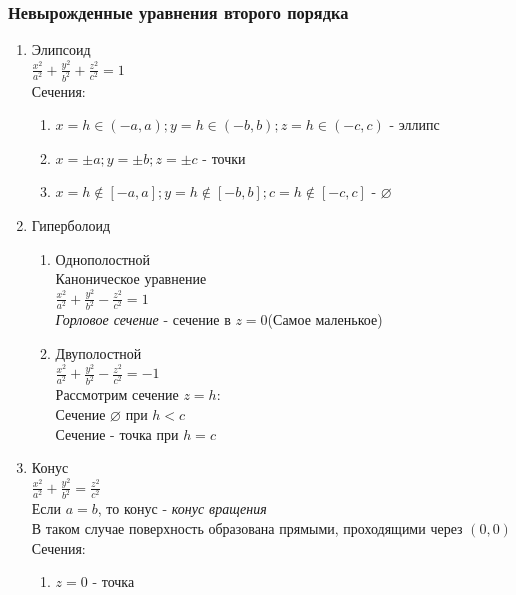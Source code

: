 \documentclass[12pt]{article}
\begin{document}
    \subsubsection{Невырожденные уравнения второго порядка}
    \begin{enumerate}
        \item Элипсоид\\
        $\frac{x^2}{a^2}+\frac{y^2}{b^2}+\frac{z^2}{c^2}=1$\\
        Сечения:
        \begin{enumerate}
            \item $x = h \in (-a,a); y = h \in (-b,b); z = h \in (-c,c)$ - эллипс
            \item $x=\pm a; y = \pm b; z = \pm c$ - точки
            \item $x = h \notin [-a,a]; y = h \notin [-b,b]; c = h \notin [-c,c]$ - $\varnothing$
        \end{enumerate}
        \item Гиперболоид
        \begin{enumerate}
            \item Однополостной\\
            Каноническое уравнение\\
            $\frac{x^2}{a^2}+\frac{y^2}{b^2}-\frac{z^2}{c^2}=1$\\
            \textit{Горловое сечение} - сечение в $z=0$(Самое маленькое)
            \item Двуполостной\\
            $\frac{x^2}{a^2}+\frac{y^2}{b^2}-\frac{z^2}{c^2}=-1$\\
            Рассмотрим сечение $z=h$:\\
            Сечение $\varnothing$ при $h < c$\\
            Сечение - точка при $h=c$\\                
        \end{enumerate}
        \item Конус\\
        $\frac{x^2}{a^2}+\frac{y^2}{b^2}=\frac{z^2}{c^2}$\\
        Если $a=b$, то конус - \textit{конус вращения}\\
        В таком случае поверхность образована прямыми, проходящими через $(0,0)$\\
        Сечения:
        \begin{enumerate}
            \item $z=0$ - точка

\end{enumerate}
\end{enumerate}
\end{document}
